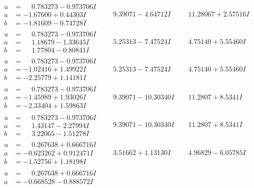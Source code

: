 \documentclass[1p]{elsarticle_modified}
\theoremstyle{definition}
\begin{document}
$$\begin{array}{c|c|c}
\begin{aligned}
u &= \phantom{-}0.783273 - 0.973706 I \\
a &= -1.67600 + 0.44303 I \\
b &= -1.81609 - 0.74728 I\end{aligned}
 & \phantom{-}9.39071 - 4.64712 I & \phantom{-}11.28067 + 2.57516 I \\ \hline\begin{aligned}
u &= \phantom{-}0.783273 - 0.973706 I \\
a &= \phantom{-}1.18679 - 1.33645 I \\
b &= \phantom{-}1.77804 - 0.80841 I\end{aligned}
 & \phantom{-}5.25313 - 7.47524 I & \phantom{-}4.75140 + 5.55460 I \\ \hline\begin{aligned}
u &= \phantom{-}0.783273 - 0.973706 I \\
a &= -1.02416 + 1.49922 I \\
b &= -2.25779 + 1.14181 I\end{aligned}
 & \phantom{-}5.25313 - 7.47524 I & \phantom{-}4.75140 + 5.55460 I \\ \hline\begin{aligned}
u &= \phantom{-}0.783273 - 0.973706 I \\
a &= -1.45989 + 1.93026 I \\
b &= -2.33404 + 1.59863 I\end{aligned}
 & \phantom{-}9.39071 - 10.30340 I & \phantom{-}11.2807 + 8.5341 I \\ \hline\begin{aligned}
u &= \phantom{-}0.783273 - 0.973706 I \\
a &= \phantom{-}1.43147 - 2.27994 I \\
b &= \phantom{-}3.22065 - 1.51278 I\end{aligned}
 & \phantom{-}9.39071 - 10.30340 I & \phantom{-}11.2807 + 8.5341 I \\ \hline\begin{aligned}
u &= \phantom{-}0.267638 + 0.666716 I \\
a &= -0.623262 + 0.912471 I \\
b &= -1.52756 + 1.18198 I\end{aligned}
 & \phantom{-}3.51662 + 1.13130 I & \phantom{-}4.96829 - 6.05785 I \\ \hline\begin{aligned}
u &= \phantom{-}0.267638 + 0.666716 I \\
a &= -0.668528 - 0.888572 I \\

\end{aligned}
\end{array}$$
\end{document}

